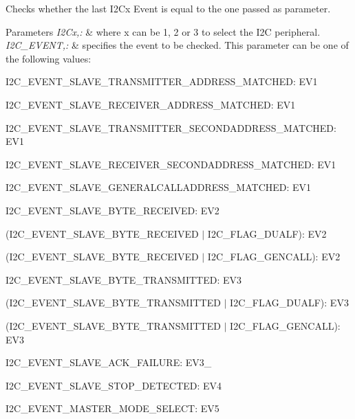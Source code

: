 Checks whether the last I2\-Cx Event is equal to the one passed as parameter. 


\begin{DoxyParams}{Parameters}
{\em I2\-Cx,\-:} & where x can be 1, 2 or 3 to select the I2\-C peripheral. \\
\hline
{\em I2\-C\-\_\-\-E\-V\-E\-N\-T,\-:} & specifies the event to be checked. This parameter can be one of the following values\-: \begin{DoxyItemize}
\item I2\-C\-\_\-\-E\-V\-E\-N\-T\-\_\-\-S\-L\-A\-V\-E\-\_\-\-T\-R\-A\-N\-S\-M\-I\-T\-T\-E\-R\-\_\-\-A\-D\-D\-R\-E\-S\-S\-\_\-\-M\-A\-T\-C\-H\-E\-D\-: E\-V1 \item I2\-C\-\_\-\-E\-V\-E\-N\-T\-\_\-\-S\-L\-A\-V\-E\-\_\-\-R\-E\-C\-E\-I\-V\-E\-R\-\_\-\-A\-D\-D\-R\-E\-S\-S\-\_\-\-M\-A\-T\-C\-H\-E\-D\-: E\-V1 \item I2\-C\-\_\-\-E\-V\-E\-N\-T\-\_\-\-S\-L\-A\-V\-E\-\_\-\-T\-R\-A\-N\-S\-M\-I\-T\-T\-E\-R\-\_\-\-S\-E\-C\-O\-N\-D\-A\-D\-D\-R\-E\-S\-S\-\_\-\-M\-A\-T\-C\-H\-E\-D\-: E\-V1 \item I2\-C\-\_\-\-E\-V\-E\-N\-T\-\_\-\-S\-L\-A\-V\-E\-\_\-\-R\-E\-C\-E\-I\-V\-E\-R\-\_\-\-S\-E\-C\-O\-N\-D\-A\-D\-D\-R\-E\-S\-S\-\_\-\-M\-A\-T\-C\-H\-E\-D\-: E\-V1 \item I2\-C\-\_\-\-E\-V\-E\-N\-T\-\_\-\-S\-L\-A\-V\-E\-\_\-\-G\-E\-N\-E\-R\-A\-L\-C\-A\-L\-L\-A\-D\-D\-R\-E\-S\-S\-\_\-\-M\-A\-T\-C\-H\-E\-D\-: E\-V1 \item I2\-C\-\_\-\-E\-V\-E\-N\-T\-\_\-\-S\-L\-A\-V\-E\-\_\-\-B\-Y\-T\-E\-\_\-\-R\-E\-C\-E\-I\-V\-E\-D\-: E\-V2 \item (I2\-C\-\_\-\-E\-V\-E\-N\-T\-\_\-\-S\-L\-A\-V\-E\-\_\-\-B\-Y\-T\-E\-\_\-\-R\-E\-C\-E\-I\-V\-E\-D $|$ I2\-C\-\_\-\-F\-L\-A\-G\-\_\-\-D\-U\-A\-L\-F)\-: E\-V2 \item (I2\-C\-\_\-\-E\-V\-E\-N\-T\-\_\-\-S\-L\-A\-V\-E\-\_\-\-B\-Y\-T\-E\-\_\-\-R\-E\-C\-E\-I\-V\-E\-D $|$ I2\-C\-\_\-\-F\-L\-A\-G\-\_\-\-G\-E\-N\-C\-A\-L\-L)\-: E\-V2 \item I2\-C\-\_\-\-E\-V\-E\-N\-T\-\_\-\-S\-L\-A\-V\-E\-\_\-\-B\-Y\-T\-E\-\_\-\-T\-R\-A\-N\-S\-M\-I\-T\-T\-E\-D\-: E\-V3 \item (I2\-C\-\_\-\-E\-V\-E\-N\-T\-\_\-\-S\-L\-A\-V\-E\-\_\-\-B\-Y\-T\-E\-\_\-\-T\-R\-A\-N\-S\-M\-I\-T\-T\-E\-D $|$ I2\-C\-\_\-\-F\-L\-A\-G\-\_\-\-D\-U\-A\-L\-F)\-: E\-V3 \item (I2\-C\-\_\-\-E\-V\-E\-N\-T\-\_\-\-S\-L\-A\-V\-E\-\_\-\-B\-Y\-T\-E\-\_\-\-T\-R\-A\-N\-S\-M\-I\-T\-T\-E\-D $|$ I2\-C\-\_\-\-F\-L\-A\-G\-\_\-\-G\-E\-N\-C\-A\-L\-L)\-: E\-V3 \item I2\-C\-\_\-\-E\-V\-E\-N\-T\-\_\-\-S\-L\-A\-V\-E\-\_\-\-A\-C\-K\-\_\-\-F\-A\-I\-L\-U\-R\-E\-: E\-V3\-\_ \item I2\-C\-\_\-\-E\-V\-E\-N\-T\-\_\-\-S\-L\-A\-V\-E\-\_\-\-S\-T\-O\-P\-\_\-\-D\-E\-T\-E\-C\-T\-E\-D\-: E\-V4 \item I2\-C\-\_\-\-E\-V\-E\-N\-T\-\_\-\-M\-A\-S\-T\-E\-R\-\_\-\-M\-O\-D\-E\-\_\-\-S\-E\-L\-E\-C\-T\-: E\-V5 \item 
\end{DoxyItemize}
\end{DoxyParams}
